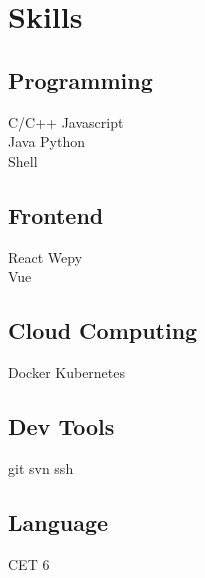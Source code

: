 \documentclass[]{deedy-resume-openfont}
\begin{document}
\begin{minipage}[t]{0.3\textwidth}

\section{Skills}
\sectionsep
\subsection{\textbf{Programming}}
C/C++ \textbullet{} Javascript\\
Java \textbullet{} Python \ \\
Shell  \\ 
\sectionsep

\subsection{\textbf{Frontend}}
React \textbullet{} Wepy \\
Vue

\subsection{Cloud Computing}
Docker \textbullet{} Kubernetes \\
\sectionsep

\subsection{Dev Tools}
git \textbullet svn \textbullet ssh \\
\sectionsep

\subsection{Language}
CET 6   \\
\sectionsep

%
%

\end{minipage} 
\hfill
\end{document}
